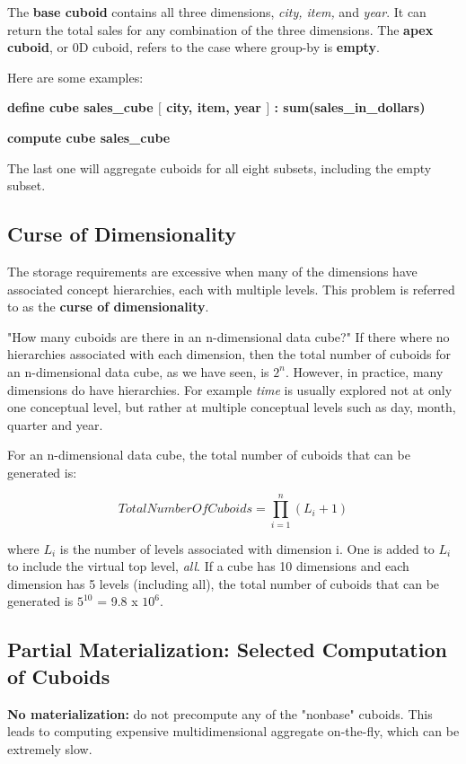 		The {\bf base cuboid} contains all three dimensions, {\it city, item,} and {\it year}.
		It can return the total sales for any combination of the three dimensions.
		The {\bf apex cuboid}, or 0D cuboid, refers to the case where group-by is {\bf empty}.

		Here are some examples:

		{\bf define cube sales\_cube $[$ city, item, year $]$ : sum(sales\_in\_dollars)}

		{\bf compute cube sales\_cube}

		The last one will aggregate cuboids for all eight subsets, including the empty subset. 
	
	\clearpage
		\subsection*{Curse of Dimensionality}
		The storage requirements are excessive when many of the dimensions have associated concept
		hierarchies, each with multiple levels. 
		This problem is referred to as the {\bf curse of dimensionality}.

		"How many cuboids are there in an n-dimensional data cube?" If there where no hierarchies
		associated with each dimension, then the total number of cuboids for an n-dimensional
		data cube, as we have seen, is $2^{n}$. However, in practice, many dimensions do have
		hierarchies. For example {\it time} is usually explored not at only one conceptual
		level, but rather at multiple conceptual levels such as day, month, quarter and year. 

		For an n-dimensional data cube, the total number of cuboids that can be generated is:

		\begin{equation}
			Total Number Of Cuboids = \prod_{i=1}^{n} (L_{i} + 1)
		\end{equation}

		where $L_{i}$ is the number of levels associated with dimension i. One is added to $L_{i}$
		to include the virtual top level, {\it all}.
		If a cube has 10 dimensions and each dimension has 5 levels (including all), the total
		number of cuboids that can be generated is $5^{10}$ = 9.8 x $10^{6}$. 

		\subsection{Partial Materialization: Selected Computation of Cuboids}

		{\bf No materialization:} do not precompute any of the "nonbase" cuboids. This leads
		to computing expensive multidimensional aggregate on-the-fly, which can be extremely slow. 

